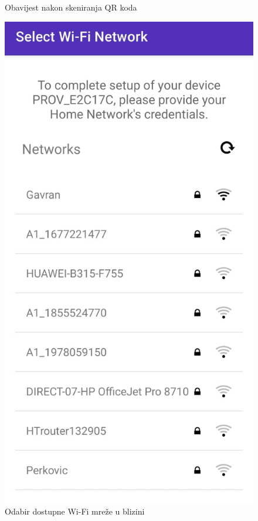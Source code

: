 \begin{figure}[ht]
\begin{minipage}[t]{0.3\textwidth}
		\caption{Obavijest nakon skeniranja QR koda}
		\label{fig:esp_softap_app1}
	\end{minipage}
	\hspace*{\fill}
	\begin{minipage}[t]{0.3\textwidth}
		\includegraphics[width=\linewidth]{imgs/esp_softap_app2}
		\caption{Odabir dostupne Wi-Fi mreže u blizini}
		\label{fig:esp_softap_app2}
	\end{minipage}
\end{figure}

